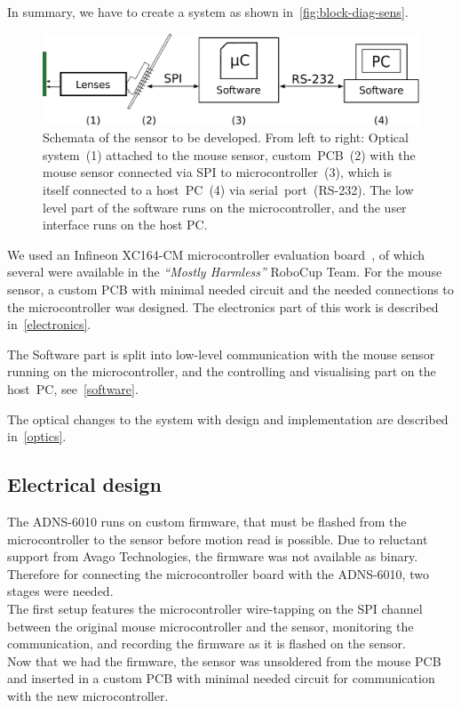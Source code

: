 \documentclass[12pt,a4paper]{article}
\newcommand{\MH}{\emph{``Mostly Harmless''} RoboCup Team\xspace}
\begin{document}
In summary, we have to create a system as shown in~\autoref{fig:block-diag-sens}.

\begin{figure}[hb]
\begin{center}
\includegraphics[width=0.9\columnwidth]{figures/block_diagram}
\caption{\label{fig:block-diag-sens}
Schemata of the sensor to be developed.
From left to right:
Optical system~(1) attached to the mouse sensor,
custom~PCB~(2) with the mouse sensor connected via SPI to microcontroller~(3), which is itself connected to a host~PC~(4) via serial~port~(RS-232).
The low level part of the software runs on the microcontroller, and the user interface runs on the host PC.
}

\end{center}
\end{figure}

We used an Infineon XC164-CM microcontroller evaluation board~\cite{xc}, of which several were available in the \MH.
For the mouse sensor, a custom PCB with minimal needed circuit and the needed connections to the microcontroller was designed.
The electronics part of this work is described in~\autoref{electronics}.

The Software part is split into low-level communication with the mouse sensor running on the microcontroller, and the controlling and visualising part on the host~PC, see~\autoref{software}.

The optical changes to the system with design and implementation are described in~\autoref{optics}.


\subsection{Electrical design}
\label{electronics}


The ADNS-6010 runs on custom firmware, that must be flashed from the microcontroller to the sensor before motion read is possible.
Due to reluctant support from Avago Technologies, the firmware was not available as binary.
Therefore for connecting the microcontroller board with the ADNS-6010, two stages were needed.\\
The first setup features the microcontroller wire-tapping on the SPI channel between the original mouse microcontroller and the sensor, monitoring the communication, and recording the firmware as it is flashed on the sensor.\\
Now that we had the firmware, the sensor was unsoldered from the mouse PCB and inserted in a custom PCB with minimal needed circuit for communication with the new microcontroller.
\end{document}

